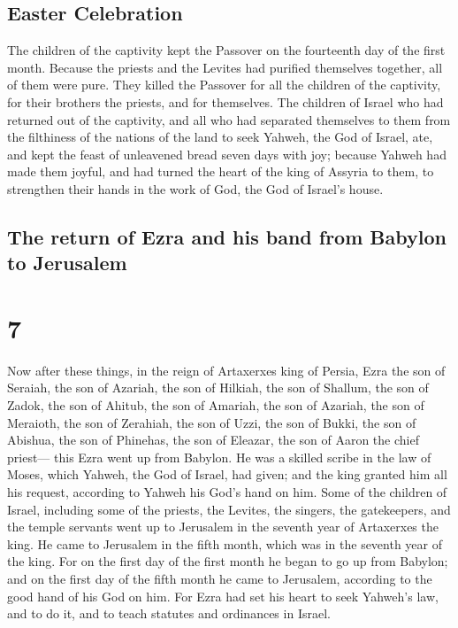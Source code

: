 \hypertarget{easter-celebration}{%
\subsection{Easter Celebration}\label{easter-celebration}}

 The children of the captivity kept the Passover on the
fourteenth day of the first month.  Because the priests
and the Levites had purified themselves together, all of them were pure.
They killed the Passover for all the children of the captivity, for
their brothers the priests, and for themselves.  The
children of Israel who had returned out of the captivity, and all who
had separated themselves to them from the filthiness of the nations of
the land to seek Yahweh, the God of Israel, ate,  and
kept the feast of unleavened bread seven days with joy; because Yahweh
had made them joyful, and had turned the heart of the king of Assyria to
them, to strengthen their hands in the work of God, the God of Israel's
house.

\hypertarget{the-return-of-ezra-and-his-band-from-babylon-to-jerusalem}{%
\subsection{The return of Ezra and his band from Babylon to
Jerusalem}\label{the-return-of-ezra-and-his-band-from-babylon-to-jerusalem}}

\hypertarget{section-6}{%
\section{7}\label{section-6}}

 Now after these things, in the reign of Artaxerxes king
of Persia, Ezra the son of Seraiah, the son of Azariah, the son of
Hilkiah,  the son of Shallum, the son of Zadok, the son of
Ahitub,  the son of Amariah, the son of Azariah, the son
of Meraioth,  the son of Zerahiah, the son of Uzzi, the
son of Bukki,  the son of Abishua, the son of Phinehas,
the son of Eleazar, the son of Aaron the chief priest--- 
this Ezra went up from Babylon. He was a skilled scribe in the law of
Moses, which Yahweh, the God of Israel, had given; and the king granted
him all his request, according to Yahweh his God's hand on him.
 Some of the children of Israel, including some of the
priests, the Levites, the singers, the gatekeepers, and the temple
servants went up to Jerusalem in the seventh year of Artaxerxes the
king.  He came to Jerusalem in the fifth month, which was
in the seventh year of the king.  For on the first day of
the first month he began to go up from Babylon; and on the first day of
the fifth month he came to Jerusalem, according to the good hand of his
God on him.  For Ezra had set his heart to seek Yahweh's
law, and to do it, and to teach statutes and ordinances in Israel.

